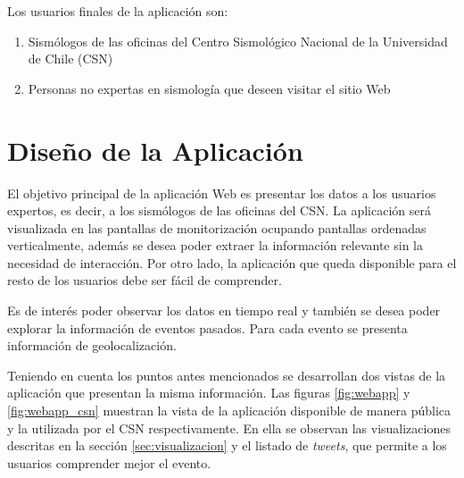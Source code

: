 Los usuarios finales de la aplicación son:

\begin{enumerate}
\item Sismólogos de las oficinas del Centro Sismológico Nacional de la Universidad de Chile (CSN)
\item Personas no expertas en sismología que deseen visitar el sitio Web
\end{enumerate}

\section{Diseño de la Aplicación}

El objetivo principal de la aplicación Web es presentar los datos a los usuarios expertos, es decir, a los sismólogos de las oficinas del CSN. 
%
La aplicación será visualizada en las pantallas de monitorización ocupando pantallas ordenadas verticalmente, además se desea poder extraer la información relevante sin la necesidad de interacción.
%
Por otro lado, la aplicación que queda disponible para el resto de los usuarios debe ser fácil de comprender. 


Es de interés poder observar los datos en tiempo real y también se desea poder explorar la información de eventos pasados. 
%
Para cada evento se presenta información de geolocalización. 


Teniendo en cuenta los puntos antes mencionados se desarrollan dos vistas de la aplicación que presentan la misma información. 
% 
Las figuras \ref{fig:webapp} y \ref{fig:webapp_csn} muestran la vista de la aplicación disponible de manera pública y la utilizada por el CSN respectivamente. 
%
En ella se observan las visualizaciones descritas en la sección \ref{sec:visualizacion} y el listado de \textit{tweets}, que permite a los usuarios comprender mejor el evento. 


